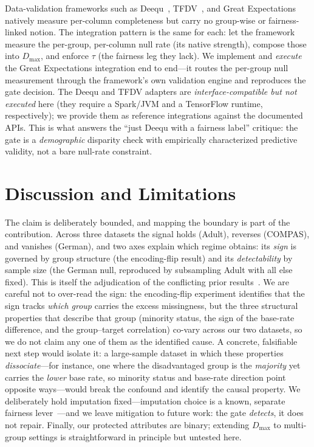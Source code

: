\documentclass[sigconf,nonacm]{acmart}
\begin{document}
Data-validation frameworks such as Deequ~\cite{schelter2018deequ},
TFDV~\cite{caveness2020}, and Great Expectations~\cite{greatexpectations} natively measure
per-column completeness but carry no group-wise or fairness-linked notion. The integration
pattern is the same for each: let the framework measure the per-group, per-column null rate
(its native strength), compose those into $D_{\max}$, and enforce $\tau$ (the fairness leg they
lack). We implement and \emph{execute} the Great Expectations integration end to end---it routes
the per-group null measurement through the framework's own validation engine and reproduces the
gate decision. The Deequ and TFDV adapters are \emph{interface-compatible but not executed} here
(they require a Spark/JVM and a TensorFlow runtime, respectively); we provide them as reference
integrations against the documented APIs. This is what answers the ``just Deequ with a fairness
label'' critique: the gate is a \emph{demographic} disparity check with empirically
characterized predictive validity, not a bare null-rate constraint.

\section{Discussion and Limitations}\label{sec:discussion}
The claim is deliberately bounded, and mapping the boundary is part of the contribution. Across
three datasets the signal holds (Adult), reverses (COMPAS), and vanishes (German), and two axes
explain which regime obtains: its \emph{sign} is governed by group structure (the encoding-flip
result) and its \emph{detectability} by sample size (the German null, reproduced by subsampling
Adult with all else fixed). This is itself the adjudication of the conflicting prior
results~\cite{bhatti2025,min2025}. We are careful not to
over-read the sign: the encoding-flip experiment identifies that the sign tracks \emph{which group}
carries the excess missingness, but the three structural properties that describe that group
(minority status, the sign of the base-rate difference, and the group--target correlation) co-vary
across our two datasets, so we do not claim any one of them as the identified cause. A concrete,
falsifiable next step would isolate it: a large-sample dataset in which these properties
\emph{dissociate}---for instance, one where the disadvantaged group is the \emph{majority} yet
carries the \emph{lower} base rate, so minority status and base-rate direction point opposite
ways---would break the confound and identify the causal property. We deliberately hold imputation
fixed---imputation choice is a known, separate fairness lever~\cite{feng2023}---and we leave
mitigation to future work: the gate \emph{detects}, it does not repair. Finally, our
protected attributes are binary; extending $D_{\max}$ to multi-group settings is straightforward in
principle but untested here.
\end{document}

